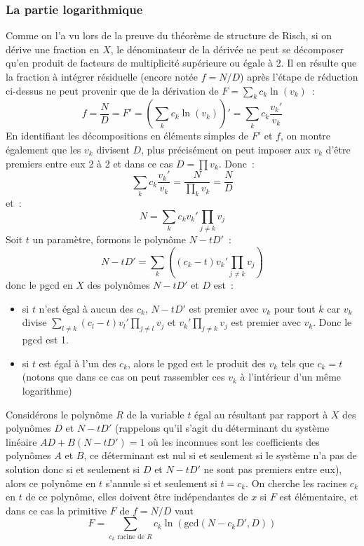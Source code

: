 \documentclass[a4paper,11pt]{article}
\begin{document}
\begin{giacjshere}
\subsubsection{La partie logarithmique}
Comme on l'a vu lors de la preuve du théorème de structure de Risch,
si on dérive une fraction en $X$, le dénominateur de la dérivée ne
peut se décomposer qu'en produit de facteurs de multiplicité supérieure
ou égale à 2. Il en résulte que la fraction à intégrer résiduelle (encore
notée $f=N/D$) après l'étape de réduction ci-dessus ne peut provenir que de la
dérivation de $F=\sum_k c_k \ln (v_k)$~:
\[ f=\frac{N}{D}=F'= (\sum_k c_k \ln (v_k))'= \sum_k c_k \frac{v_k'}{v_k}\]
En identifiant les décompositions
en éléments simples de $F'$ et $f$, on montre également que 
les $v_k$ divisent $D$, plus précisément on peut imposer aux $v_k$
d'être premiers entre eux 2 à 2 et dans ce cas $D=\prod v_k$. 
Donc~:
\[ \sum_k c_k \frac{v_k'}{v_k} = \frac{N}{\prod_k v_k}=\frac{N}{D}\]
et~:
\[ N = \sum_k c_k v_k' \prod_{j\neq k} v_j \]
Soit $t$ un paramètre, formons le polynôme $N-tD'$~:
\[ N-tD' = \sum_k \left( (c_k -t) v_k' \prod_{j\neq k} v_j \right) \]
donc le pgcd en $X$ des polynômes $N-tD'$ et $D$ est~:
\begin{itemize}
\item si $t$ n'est égal à aucun des $c_k$, $N-tD'$ est premier
avec $v_k$ pour tout $k$ car $v_k$ divise
$\sum_{l \neq k} (c_l -t) v_l' \prod_{j\neq l} v_j$
et $v_k'\prod_{j\neq k} v_j $ est premier avec $v_k$. Donc
le pgcd est 1.
\item si $t$ est égal à l'un des $c_k$, alors le pgcd est le produit
des $v_k$ tels que $c_k=t$ (notons que dans ce cas on peut
rassembler ces $v_k$ à l'intérieur d'un même logarithme)
\end{itemize}
Considérons le polynôme $R$ de la variable $t$ égal au résultant par rapport
à $X$ des polynômes $D$ et $N-tD'$ (rappelons qu'il s'agit du
d\'eterminant du syst\`eme lin\'eaire $AD+B(N-tD')=1$
o\`u les inconnues sont les coefficients des polyn\^omes $A$ et $B$, 
ce d\'eterminant est nul si et seulement si le syst\`eme n'a pas
de solution donc si et seulement si $D$ et $N-tD'$ ne sont pas
premiers entre eux), alors ce polynôme en $t$
s'annule si et seulement si $t=c_k$. 
On cherche les racines $c_k$ en $t$ de ce polynôme,
elles doivent être indépendantes de $x$ si $F$ est élémentaire,
et dans ce cas la primitive $F$ de $f=N/D$ vaut
\[ F=\sum_{c_k \mbox{ racine de } R} c_k \ln(\mbox{gcd}(N-c_k D',D)) \]


\end{giacjshere}
\end{document}
